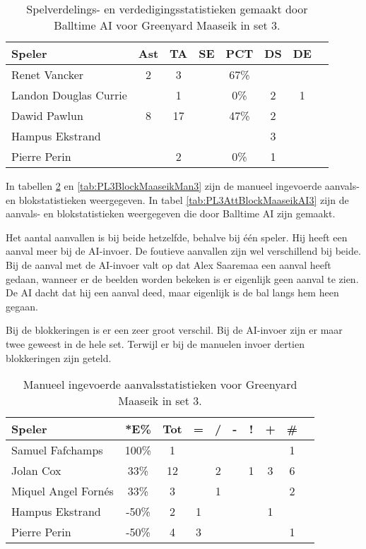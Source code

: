 \begin{table}[ht!]
  \centering
  \scriptsize
    \begin{tabular}{|l|c|c|c|c|c|c|c|} \hline
    \textbf{Speler} & Ast & TA & SE & PCT & DS & DE \\ \hline
    Renet Vancker & 2 & 3 &  & 67\% &   &   \\
    Landon Douglas Currie &  & 1 &  & 0\% & 2 & 1 \\
    Dawid Pawlun & 8 & 17 & & 47\% & 2 &  \\
    Hampus Ekstrand &  &  &  &  & 3 &  \\
    Pierre Perin &  & 2 &  & 0\% & 1 &  \\ \hline
  \end{tabular}
  \caption[Spelverdelings- en verdedigingsstatistieken gemaakt door Balltime AI voor Greenyard Maaseik in set 3]{\label{tab:PL3SetDigMaaseikAI3}Spelverdelings- en verdedigingsstatistieken gemaakt door Balltime AI voor Greenyard Maaseik in set 3.}
\end{table}

In tabellen \ref{tab:PL3AttMaaseikMan3} en \ref{tab:PL3BlockMaaseikMan3} zijn de manueel ingevoerde aanvals- en blokstatistieken weergegeven. In tabel \ref{tab:PL3AttBlockMaaseikAI3} zijn de aanvals- en blokstatistieken weergegeven die door Balltime AI zijn gemaakt. 

Het aantal aanvallen is bij beide hetzelfde, behalve bij één speler. Hij heeft een aanval meer bij de AI-invoer. De foutieve aanvallen zijn wel verschillend bij beide. Bij de aanval met de AI-invoer valt op dat Alex Saaremaa een aanval heeft gedaan, wanneer er de beelden worden bekeken is er eigenlijk geen aanval te zien. De AI dacht dat hij een aanval deed, maar eigenlijk is de bal langs hem heen gegaan.

Bij de blokkeringen is er een zeer groot verschil. Bij de AI-invoer zijn er maar twee geweest in de hele set. Terwijl er bij de manuelen invoer dertien blokkeringen zijn geteld.

\begin{table}[ht!]
    \centering
    \scriptsize
    \begin{tabular}{|l|c|c|c|c|c|c|c|c|c|} \hline
        \textbf{Speler} & *E\% & Tot & = & / & - & ! & + & \#\\ \hline
        Samuel Fafchamps & 100\% & 1 &  &  &  &  &  & 1 \\ 
        Jolan Cox & 33\% & 12 &  & 2 &  & 1 & 3 & 6 \\ 
        Miquel Angel Fornés & 33\% & 3 &  & 1 &  &  &  & 2 \\ 
        Hampus Ekstrand & -50\% & 2 & 1 &  &  &  & 1 & \\ 
        Pierre Perin & -50\% & 4 & 3 &  &  &  &  & 1 \\ \hline
    \end{tabular}
    \caption[Manueel ingevoerde aanvalsstatistieken voor Greenyard Maaseik in set 3]{\label{tab:PL3AttMaaseikMan3}Manueel ingevoerde aanvalsstatistieken voor Greenyard Maaseik in set 3.}
\end{table}

